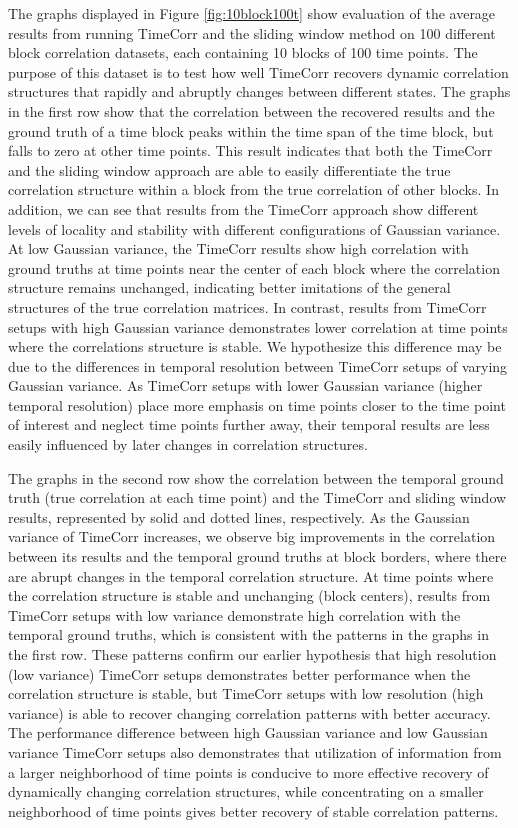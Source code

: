 \documentclass[11pt]{article}
\begin{document}
The graphs displayed in Figure \ref{fig:10block100t} show evaluation of the average results from running TimeCorr and the sliding window method on 100 different block correlation datasets, each containing 10 blocks of 100 time points. The purpose of this dataset is to test how well TimeCorr recovers dynamic correlation structures that rapidly and abruptly changes between different states. The graphs in the first row show that the correlation between the recovered results and the ground truth of a time block peaks within the time span of the time block, but falls to zero at other time points. This result indicates that both the TimeCorr and the sliding window approach are able to easily differentiate the true correlation structure within a block from the true correlation of other blocks. In addition, we can see that results from the TimeCorr approach show different levels of locality and stability with different configurations of Gaussian variance. At low Gaussian variance, the TimeCorr results show high correlation with ground truths at time points near the center of each block where the correlation structure remains unchanged, indicating better imitations of the general structures of the true correlation matrices. In contrast, results from TimeCorr setups with high Gaussian variance demonstrates lower correlation at time points where the correlations structure is stable. We hypothesize this difference may be due to the differences in temporal resolution between TimeCorr setups of varying Gaussian variance. As TimeCorr setups with lower Gaussian variance (higher temporal resolution) place more emphasis on time points closer to the time point of interest and neglect time points further away, their temporal results are less easily influenced by later changes in correlation structures.

The graphs in the second row show the correlation between the temporal ground truth (true correlation at each time point) and the TimeCorr and sliding window results, represented by solid and dotted lines, respectively. As the Gaussian variance of TimeCorr increases, we observe big improvements in the correlation between its results and the temporal ground truths at block borders, where there are abrupt changes in the temporal correlation structure. At time points where the correlation structure is stable and unchanging (block centers), results from TimeCorr setups with low variance demonstrate high correlation with the temporal ground truths, which is consistent with the patterns in the graphs in the first row. These patterns confirm our earlier hypothesis that high resolution (low variance) TimeCorr setups demonstrates better performance when the correlation structure is stable, but TimeCorr setups with low resolution (high variance) is able to recover changing correlation patterns with better accuracy. The performance difference between high Gaussian variance and low Gaussian variance TimeCorr setups also demonstrates that utilization of information from a larger neighborhood of time points is conducive to more effective recovery of dynamically changing correlation structures, while concentrating on a smaller neighborhood of time points gives better recovery of stable correlation patterns.
\end{document}
